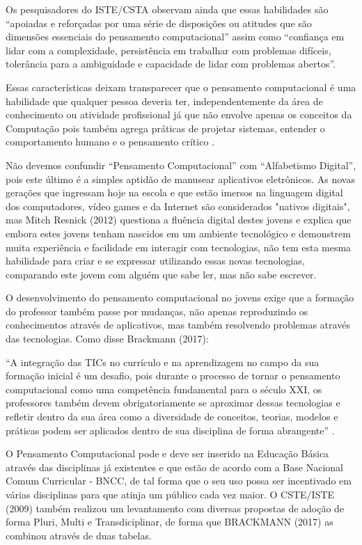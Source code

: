 \documentclass[12pt, openright, a4paper, brazil, english, french, spanish, bibjustif, openany, oneside]{abntex2}
\begin{document}
Os pesquisadores do ISTE/CSTA observam ainda que essas habilidades são ``apoiadas e reforçadas por uma série de disposições ou atitudes que são dimensões essenciais do pensamento computacional'' assim como ``confiança em lidar com a complexidade, persistência em trabalhar com problemas difíceis, tolerância para a ambiguidade e capacidade de lidar com problemas abertos''\cite{iste/csta}.

Essas características deixam transparecer que o pensamento computacional é uma habilidade que qualquer pessoa deveria ter, independentemente da área de conhecimento ou atividade profissional já que não envolve apenas os conceitos da Computação pois também agrega práticas de projetar sistemas, entender o comportamento humano e o pensamento crítico \cite{wing}.

Não devemos confundir ``Pensamento Computacional'' com ``Alfabetismo Digital'', pois este último é a simples aptidão de manusear aplicativos eletrônicos. As novas gerações que ingressam hoje na escola e que estão imersos na linguagem digital dos computadores, vídeo games e da Internet são considerados "nativos digitais", mas Mitch Resnick (2012) questiona a fluência digital destes jovens e explica que embora estes jovens tenham nascidos em um ambiente tecnológico e demonstrem muita experiência e facilidade em interagir com tecnologias, não tem esta mesma habilidade para criar e se expressar utilizando essas novas tecnologias, comparando este jovem com alguém que sabe ler, mas não sabe escrever.

O desenvolvimento do pensamento computacional no jovens exige que a formação do professor também passe por mudanças, não apenas reproduzindo os conhecimentos através de aplicativos, mas também resolvendo problemas através das tecnologias. Como disse Brackmann (2017):

\begin{citacao}

``A integração das TICs no currículo e na aprendizagem no campo da sua formação inicial é um desafio, pois durante o processo de tornar o pensamento computacional como uma competência fundamental para o século XXI, os professores também devem obrigatoriamente se aproximar dessas tecnologias e refletir dentro da sua área como a diversidade de conceitos, teorias, modelos e práticas podem ser aplicados dentro de sua disciplina de forma abrangente'' \cite{brac}. 

\end{citacao}


O Pensamento Computacional pode e deve ser inserido na Educação Básica através das disciplinas já existentes e que estão de acordo com a Base Nacional Comum Curricular - BNCC, de tal forma que o seu uso possa ser incentivado em várias disciplinas para que atinja um público cada vez maior. O CSTE/ISTE (2009) também realizou um levantamento com diversas propostas de adoção de forma Pluri, Multi e Transdiciplinar, de forma que BRACKMANN (2017) as combinou através de duas tabelas.
\end{document}
